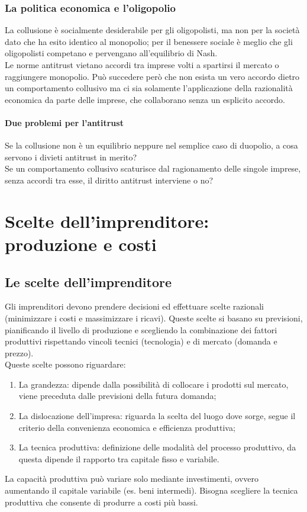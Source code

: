 \documentclass{report}
\begin{document}
	\subsection{La politica economica e l'oligopolio}
	La collusione è socialmente desiderabile per gli oligopolisti, ma non per la società dato che ha esito identico al monopolio; per il benessere sociale è meglio che gli oligopolisti competano e pervengano all'equilibrio di Nash.
	\medskip \\Le norme antitrust vietano accordi tra imprese volti a spartirsi il mercato o raggiungere monopolio. Può succedere però che non esista un vero accordo dietro un comportamento collusivo ma ci sia solamente l'applicazione della razionalità economica da parte delle imprese, che collaborano senza un esplicito accordo.
	\subsubsection{Due problemi per l'antitrust}
	Se la collusione non è un equilibrio neppure nel semplice caso di duopolio, a cosa servono i divieti antitrust in merito?
	\medskip \\Se un comportamento collusivo scaturisce dal ragionamento delle singole imprese, senza accordi tra esse, il diritto antitrust interviene o no?
	
	\chapter{Scelte dell'imprenditore: produzione e costi}
	\section{Le scelte dell'imprenditore}
	Gli imprenditori devono prendere decisioni ed effettuare scelte razionali (minimizzare i costi e massimizzare i ricavi). Queste scelte si basano su previsioni, pianificando il livello di produzione e scegliendo la combinazione dei fattori produttivi rispettando vincoli tecnici (tecnologia) e di mercato (domanda e prezzo).
	\medskip \\
	Queste scelte possono riguardare:
	\begin{enumerate}
		\item La grandezza: dipende dalla possibilità di collocare i prodotti sul mercato, viene preceduta dalle previsioni della futura domanda;
		\item La dislocazione dell'impresa: riguarda la scelta del luogo dove sorge, segue il criterio della convenienza economica e efficienza produttiva;
		\item La tecnica produttiva: definizione delle modalità del processo produttivo, da questa dipende il rapporto tra capitale fisso e variabile.
	\end{enumerate}
	La capacità produttiva può variare solo mediante investimenti, ovvero aumentando il capitale variabile (es. beni intermedi). Bisogna scegliere la tecnica produttiva che consente di produrre a costi più bassi.
\end{document}
